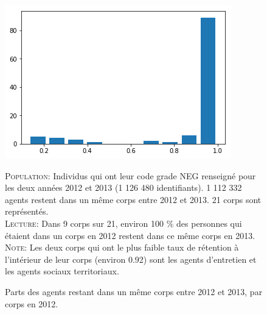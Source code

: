 \documentclass[11pt,a4paper]{article}
\begin{document}
\begin{figure}[H] 
	\caption{Parts des agents restant dans un même corps entre 2012 et 2013, par corps en 2012.}
	\label{transit1} 
	\includegraphics[scale = 0.7]{transitions_intra_corps_2012_2013.png} 
\begin{minipage}{15cm}
	\footnotesize
	\textsc{Population:} Individus qui ont leur code grade NEG renseigné pour les deux années 2012 et 2013 (1 126 480 identifiants). 1 112 332 agents restent dans un même corps entre 2012 et 2013. 21 corps sont représentés.\\
	\textsc{Lecture:} Dans 9 corps sur 21, environ 100 \% des personnes qui étaient dans un corps en 2012 restent dans ce même corps en 2013. \\
	\textsc{Note:} Les deux corps qui ont le plus faible taux de rétention à l'intérieur de leur corps (environ 0.92) sont les agents d'entretien et les agents sociaux territoriaux.
\end{minipage}
\end{figure}
\end{document}
